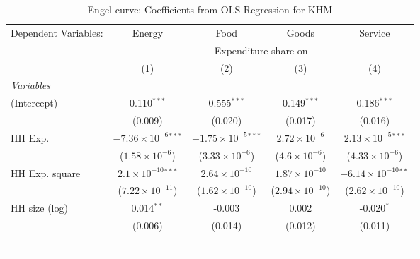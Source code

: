 
\begin{table}[htbp!]
   \centering
   \small
   \begin{adjustbox}{width = 1\textwidth, max height = 0.95\textheight, center}
      \begin{threeparttable}[b]
         \caption{\label{tab:Engel_parametric_KHM} Engel curve: Coefficients from OLS-Regression for KHM}
         \begin{tabular}{lcccc}
            \tabularnewline \midrule \midrule
            Dependent Variables: & Energy                         & Food                           & Goods                    & Service\\  
             & \multicolumn{4}{c}{Expenditure share on} \\ 
                                 & (1)                            & (2)                            & (3)                      & (4)\\  
            \midrule
            \emph{Variables}\\
            (Intercept)          & 0.110$^{***}$                  & 0.555$^{***}$                  & 0.149$^{***}$            & 0.186$^{***}$\\   
                                 & (0.009)                        & (0.020)                        & (0.017)                  & (0.016)\\   
            HH Exp.              & $-7.36\times 10^{-6}$$^{***}$  & $-1.75\times 10^{-5}$$^{***}$  & $2.72\times 10^{-6}$     & $2.13\times 10^{-5}$$^{***}$\\    
                                 & ($1.58\times 10^{-6}$)         & ($3.33\times 10^{-6}$)         & ($4.6\times 10^{-6}$)    & ($4.33\times 10^{-6}$)\\    
            HH Exp. square       & $2.1\times 10^{-10}$$^{***}$   & $2.64\times 10^{-10}$          & $1.87\times 10^{-10}$    & $-6.14\times 10^{-10}$$^{**}$\\    
                                 & ($7.22\times 10^{-11}$)        & ($1.62\times 10^{-10}$)        & ($2.94\times 10^{-10}$)  & ($2.62\times 10^{-10}$)\\    
            HH size (log)        & 0.014$^{**}$                   & -0.003                         & 0.002                    & -0.020$^{*}$\\   
                                 & (0.006)                        & (0.014)                        & (0.012)                  & (0.011)\\   
            \midrule 
$$
\end{tabular}
\end{threeparttable}
\end{adjustbox}
\end{table}
